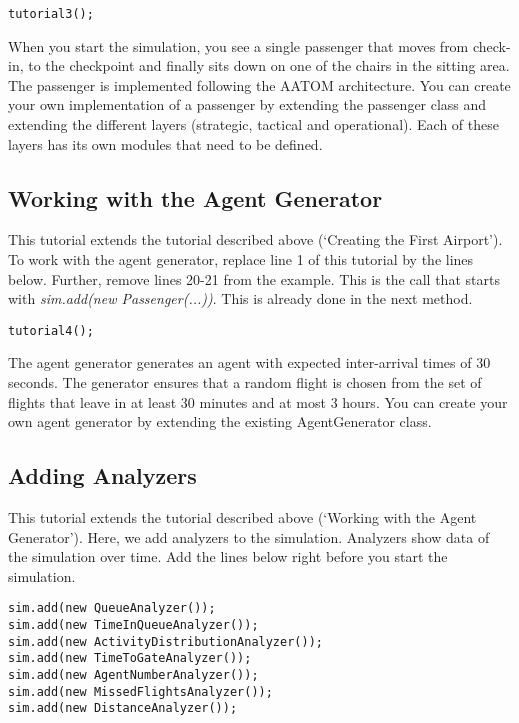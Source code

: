 \documentclass{article}
\begin{document}
\begin{verbatim}
tutorial3();
\end{verbatim}

When you start the simulation, you see a single passenger that moves from check-in, to the checkpoint and finally sits down on one of the chairs in the sitting area. The passenger is implemented following the AATOM architecture. You can create your own implementation of a passenger by extending the passenger class and extending the different layers (strategic, tactical and operational). Each of these layers has its own modules that need to be defined. 

\subsection{Working with the Agent Generator}
This tutorial extends the tutorial described above (`Creating the First Airport'). To work with the agent generator, replace line 1 of this tutorial by the lines below. Further, remove lines 20-21 from the example. This is the call that starts with \textit{sim.add(new Passenger(...))}. This is already done in the next method.

\begin{verbatim}
tutorial4();
\end{verbatim}

The agent generator generates an agent with expected inter-arrival times of 30 seconds. The generator ensures that a random flight is chosen from the set of flights that leave in at least 30 minutes and at most 3 hours. You can create your own agent generator by extending the existing AgentGenerator class.

\subsection{Adding Analyzers}
This tutorial extends the tutorial described above (`Working with the Agent Generator'). Here, we add analyzers to the simulation. Analyzers show data of the simulation over time. Add the lines below right before you start the simulation.

\begin{verbatim}
sim.add(new QueueAnalyzer());
sim.add(new TimeInQueueAnalyzer());
sim.add(new ActivityDistributionAnalyzer());
sim.add(new TimeToGateAnalyzer());
sim.add(new AgentNumberAnalyzer());
sim.add(new MissedFlightsAnalyzer());
sim.add(new DistanceAnalyzer());
\end{verbatim}
\end{document}
